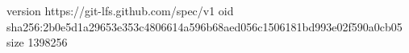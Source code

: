 version https://git-lfs.github.com/spec/v1
oid sha256:2b0e5d1a29653e353c4806614a596b68aed056c1506181bd993e02f590a0cb05
size 1398256
